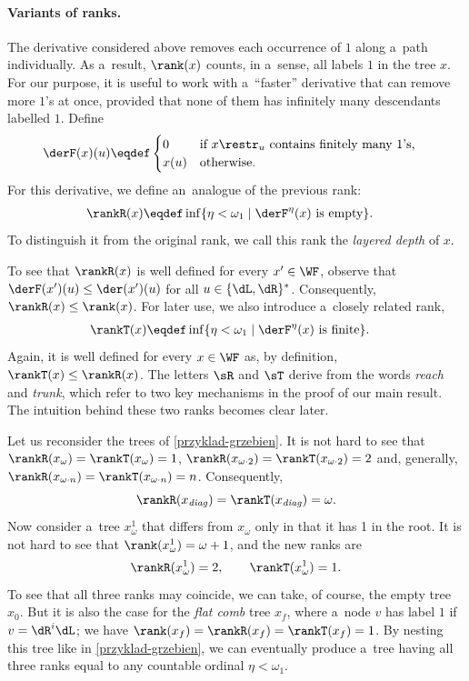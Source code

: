 \documentclass{lmcs}
\numberwithin{equation}{section}
\numberwithin{figure}{section}
\begin{document}
\paragraph{Variants of ranks.}
The derivative considered above removes each occurrence of $1$ along a~path individually.
As a~result, $\rank(x)$ counts, in a~sense, all labels $1$ in the tree $x$.
For our purpose, it is useful to work with a~``faster'' derivative that can remove more $1$'s at once, provided that none of them has infinitely many descendants labelled $1$.
Define
\begin{align*}
	\derF(x)(u) &\eqdef
	\begin{cases}
	  0	& \text{if $x\restr_u$ contains finitely many $1$'s,} \\
	  x(u)	& \text{otherwise.}
	\end{cases}
\end{align*}
For this derivative, we define an~analogue of the previous rank:
\begin{align*}
	\rankR(x)&\eqdef\inf \{\eta<\omega_1\mid \text{$\derF^\eta(x)$ is empty}\}.
\end{align*}
To distinguish it from the original rank, we call this rank the \emph{layered depth} of $x$.

To see that $\rankR(x)$ is well defined for every $x' \in \WF$, observe that $\derF(x')(u) \leq \der(x')(u)$ for all $u\in\{\dL,\dR\}^\ast$. Consequently, $\rankR(x) \leq \rank(x)$.
For later use, we also introduce a~closely related rank,
\begin{align*}
	\rankT(x)&\eqdef\inf \{\eta<\omega_1\mid \text{$\derF^\eta(x)$ is finite}\}.
\end{align*}
Again, it is well defined for every $x \in \WF$ as, by definition, $\rankT(x) \leq \rankR(x)$.
The letters $\sR$ and $\sT$ derive from the words \emph{reach} and \emph{trunk}, which refer to two key mechanisms in the proof of our main result.
The intuition behind these two ranks becomes clear later.

\begin{exa}
	Let us reconsider the trees of \cref{przyklad-grzebien}.
	It is not hard to see that $\rankR(x_\omega) = \rankT(x_\omega) = 1$, $\rankR(x_{\omega\cdot 2})=\rankT(x_{\omega \cdot 2}) = 2$
	and, generally, $\rankR(x_{\omega\cdot n})=\rankT(x_{\omega \cdot n}) = n$.
	Consequently,
	\[
	\rankR(x_{\mathit{diag}}) =\rankT(x_{\mathit{diag}}) = \omega.
	\]
	Now consider a~tree $x^1_\omega$ that differs from $x_\omega$ only in that it has 1 in the root.
	It is not hard to see that $\rank(x^1_\omega)=\omega + 1$, and the new ranks are
	\[
	  \rankR(x^1_\omega)=2, \qquad \rankT(x^1_\omega)=1.
	\]
	To see that all three ranks may coincide, we can take, of course, the empty tree $x_0$.
	But it is also the case for the \emph{flat comb} tree $x_f$, where a~node $v$ has label $1$ if $v=\dR^i\dL$;
	we have $\rank(x_f) = \rankR(x_f) = \rankT(x_f) = 1$.
	By nesting this tree like in \cref{przyklad-grzebien}, we can eventually produce a~tree having all three ranks equal to any countable ordinal $\eta<\omega_1$.
\end{exa}
\end{document}
